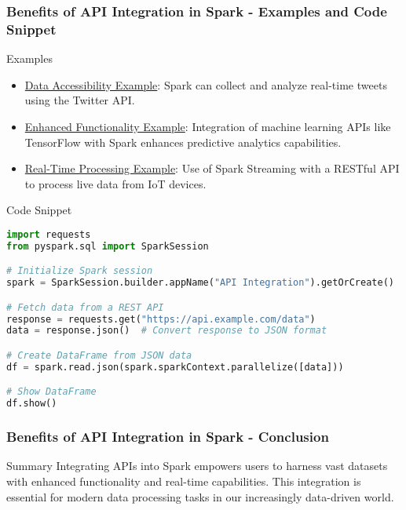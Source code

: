 \documentclass[aspectratio=169]{beamer}
\begin{document}
\begin{frame}[fragile]
    \frametitle{Benefits of API Integration in Spark - Examples and Code Snippet}
    \begin{block}{Examples}
        \begin{itemize}
            \item \underline{Data Accessibility Example}: 
                Spark can collect and analyze real-time tweets using the Twitter API.
            \item \underline{Enhanced Functionality Example}:
                Integration of machine learning APIs like TensorFlow with Spark enhances predictive analytics capabilities.
            \item \underline{Real-Time Processing Example}:
                Use of Spark Streaming with a RESTful API to process live data from IoT devices.
        \end{itemize}
    \end{block}

    \begin{block}{Code Snippet}
        \begin{lstlisting}[language=Python]
import requests
from pyspark.sql import SparkSession

# Initialize Spark session
spark = SparkSession.builder.appName("API Integration").getOrCreate()

# Fetch data from a REST API
response = requests.get("https://api.example.com/data")
data = response.json()  # Convert response to JSON format

# Create DataFrame from JSON data
df = spark.read.json(spark.sparkContext.parallelize([data]))

# Show DataFrame
df.show()
        \end{lstlisting}
    \end{block}
\end{frame}

\begin{frame}[fragile]
    \frametitle{Benefits of API Integration in Spark - Conclusion}
    \begin{block}{Summary}
        Integrating APIs into Spark empowers users to harness vast datasets with enhanced functionality and real-time capabilities. 
        This integration is essential for modern data processing tasks in our increasingly data-driven world.
    \end{block}
\end{frame}
\end{document}
